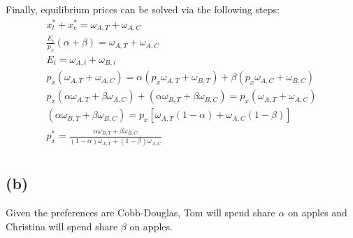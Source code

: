 \documentclass[10pt,a4paper]{article}
\begin{document}
    Finally, equilibrium prices can be solved via the following steps:
    \begin{gather*}
      x^*_t + x^*_c = \omega_{A,T} + \omega_{A,C} \\
      \frac{E_i}{p_x}(\alpha+\beta) = \omega_{A,T} + \omega_{A,C} \\
      E_i = \omega_{A,i} + \omega_{B,i} \\
      p_x(\omega_{A,T} + \omega_{A,C}) = \alpha(p_x\omega_{A,T} + \omega_{B,T}) + \beta(p_x\omega_{A,C} + \omega_{B,C}) \\
      p_x(\alpha\omega_{A,T} + \beta\omega_{A,C}) + (\alpha\omega_{B,T} + \beta\omega_{B,C}) = p_x(\omega_{A,T}+\omega_{A,C}) \\
      (\alpha\omega_{B,T} + \beta\omega_{B,C}) = p_x[\omega_{A,T}(1-\alpha) + \omega_{A,C}(1-\beta)] \\
      \boxed{p_x^* = \frac{\alpha\omega_{B,T} + \beta\omega_{B,C}}{(1-\alpha)\omega_{A,T} + (1-\beta)\omega_{A,C}}} \\
    \end{gather*}
  \subsection*{(b)}
    Given the preferences are Cobb-Douglas, Tom will spend share $\alpha$ on apples and Christina will spend share $\beta$ on apples.
\end{document}
